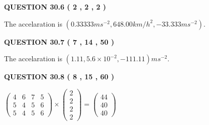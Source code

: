 \documentclass[12pt]{article}
\begin{document}
\vspace{0.2in}
  
{\textbf{\Large{QUESTION
30.6 
 (           2 ,           2 ,           2 )
}}}
  
  
 
 
\noindent{}
 
 
The accelaration is
$(
0.33333ms^{-2},
648.00km/h^2,
-33.333ms^{-2}
).
$
 
 
 
 
  
\vspace{0.2in}
  
{\textbf{\Large{QUESTION
30.7 
 (           7 ,          14 ,          50 )
}}}
  
  
 
 
\noindent{}
 
 
  The accelaration is $  %
(
1.11,
5.6 \times 10^{-2},
-111.11)
ms^{-2} $.
 
 
 
 
  
\vspace{0.2in}
  
{\textbf{\Large{QUESTION
30.8 
 (           8 ,          15 ,          60 )
}}}
  
  
 
 
\noindent{}

 
$\left( \begin{array}{ccccccccccccccc}
           4  & 
           6  & 
           7  & 
           5  \\ 
           5  & 
           4  & 
           5  & 
           6  \\ 
           5  & 
           4  & 
           5  & 
           6
\end{array}\right) \times
\left( \begin{array}{c}
           2  \\ 
           2  \\ 
           2  \\ 
           2
\end{array}\right)  =
\left( \begin{array}{c}
          44  \\ 
          40  \\ 
          40
\end{array}\right)  $
 
\end{document}

